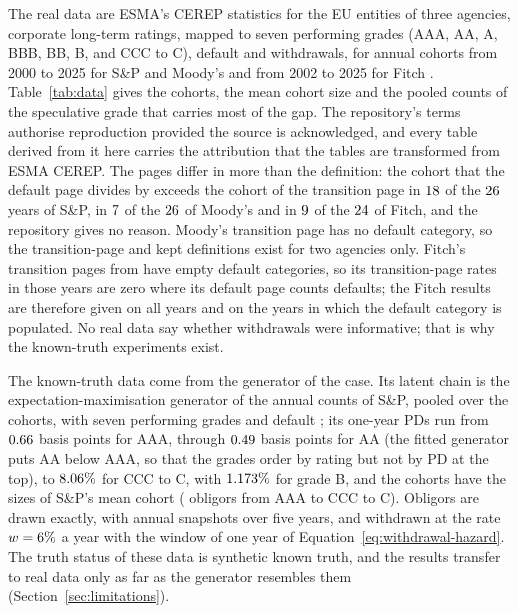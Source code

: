 The real data are ESMA's CEREP statistics for the EU entities of three agencies, corporate long-term ratings, mapped to seven performing grades (AAA, AA, A, BBB, BB, B, and CCC to C), default and withdrawals, for annual cohorts from 2000 to 2025 for S\&P and Moody's and from 2002 to 2025 for Fitch \citep{ESMA_CEREP}. Table~\ref{tab:data} gives the cohorts, the mean cohort size and the pooled counts of the speculative grade that carries most of the gap. The repository's terms authorise reproduction provided the source is acknowledged, and every table derived from it here carries the attribution that the tables are transformed from ESMA CEREP. The pages differ in more than the definition: the cohort that the default page divides by exceeds the cohort of the transition page in $18$ of the $26$ years of S\&P, in $7$ of the $26$ of Moody's and in $9$ of the $24$ of Fitch, and the repository gives no reason. Moody's transition page has no default category, so the transition-page and kept definitions exist for two agencies only. Fitch's transition pages from \fiPopDropped{} have empty default categories, so its transition-page rates in those \fiPopDroppedN{} years are zero where its default page counts defaults; the Fitch results are therefore given on all \fiCohorts{} years and on the \fiPopYears{} years in which the default category is populated. No real data say whether withdrawals were informative; that is why the known-truth experiments exist.



The known-truth data come from the generator of the case. Its latent chain is the expectation-maximisation generator of the annual counts of S\&P, pooled over the cohorts, with seven performing grades and default \citep{dosReis_2018,Bladt_2005}; its one-year PDs run from $0.66$ basis points for AAA, through $0.49$ basis points for AA (the fitted generator puts AA below AAA, so that the grades order by rating but not by PD at the top), to $8.06\%$ for CCC to C, with $1.173\%$ for grade B, and the cohorts have the sizes of S\&P's mean cohort (\genSizes{} obligors from AAA to CCC to C). Obligors are drawn exactly, with annual snapshots over five years, and withdrawn at the rate $w=6\%$ a year with the window of one year of Equation~\eqref{eq:withdrawal-hazard}. The truth status of these data is synthetic known truth, and the results transfer to real data only as far as the generator resembles them (Section~\ref{sec:limitations}). %

